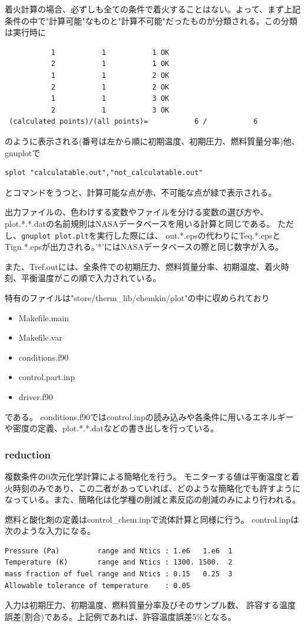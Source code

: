 \documentclass{jsarticle}
\begin{document}
着火計算の場合、必ずしも全ての条件で着火することはない。よって、まず上記条件の中で"計算可能"なものと"計算不可能"だったものが分類される。この分類は実行時に
\begin{verbatim}
           1           1           1 OK
           2           1           1 OK
           1           1           2 OK
           2           1           2 OK
           1           1           3 OK
           2           1           3 OK
 (calculated points)/(all points)=           6 /           6
\end{verbatim}
のように表示される(番号は左から順に初期温度、初期圧力、燃料質量分率)他、gnuplotで
\begin{verbatim}
splot "calculatable.out","not_calculatable.out"
\end{verbatim}
とコマンドをうつと、計算可能な点が赤、不可能な点が緑で表示される。

出力ファイルの、色わけする変数やファイルを分ける変数の選び方や、
plot.*.*.datの名前規則はNASAデータベースを用いる計算と同じである。
ただし、\verb|gnuplot plot.plt|を実行した際には、
out.*.epsの代わりにTeq.*.epsとTign.*.epsが出力される。'*'にはNASAデータベースの際と同じ数字が入る。

また、Tref.outには、全条件での初期圧力、燃料質量分率、初期温度、着火時刻、平衡温度がこの順で入力されている。

\hspace{1em}

特有のファイルは"store/therm\_lib/chemkin/plot"の中に収められており
\begin{itemize}
\item Makefile.main
\item Makefile.var
\item conditions.f90
\item control.part.inp
\item driver.f90
\end{itemize}
である。
conditions.f90ではcontrol.inpの読み込みや各条件に用いるエネルギーや密度の定義、plot.*.*.datなどの書き出しを行っている。
\subsubsection{reduction}%
複数条件の0次元化学計算による簡略化を行う。
モニターする値は平衡温度と着火時刻のみであり、この二者があっていれば、どのような簡略化でも許すようになっている。また、簡略化は化学種の削減と素反応の削減のみにより行われる。

燃料と酸化剤の定義はcontrol\_chem.inpで流体計算と同様に行う。
control.inpは次のような入力になる。
\begin{verbatim}
Pressure (Pa)         range and Ntics : 1.e6   1.e6  1
Temperature (K)       range and Ntics : 1300. 1500.  2
mass fraction of fuel range and Ntics : 0.15   0.25  3
Allowable tolerance of temperature    : 0.05
\end{verbatim}
入力は初期圧力、初期温度、燃料質量分率及びそのサンプル数、
許容する温度誤差(割合)である。上記例であれば、許容温度誤差5\%となる。
\end{document}
